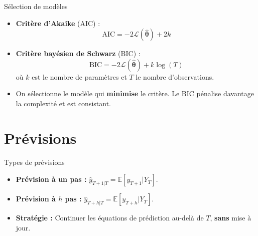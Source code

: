 \documentclass[11pt,aspectratio=169]{beamer}
\newcommand{\E}{\mathbb{E}}
\begin{document}
\begin{frame}{Sélection de modèles}

\begin{itemize}

\item \textbf{Critère d'Akaike} (AIC) :
  \[
  \mathrm{AIC} = -2\mathcal{L}(\hat{\bm{\theta}}) + 2k
  \]\newline

\item \textbf{Critère bayésien de Schwarz} (BIC) :
  \[
  \mathrm{BIC} = -2\mathcal{L}(\hat{\bm{\theta}}) + k \log(T)
  \]
  où $k$ est le nombre de paramètres et $T$ le nombre d'observations.\newline

\item On sélectionne le modèle qui \textbf{minimise} le critère. Le BIC pénalise davantage la complexité et est consistant.

\end{itemize}

\end{frame}

\section{Prévisions}

\begin{frame}{Types de prévisions}

\begin{itemize}

\item \textbf{Prévision à un pas :} $\hat{y}_{T+1|T} = \E[y_{T+1} | Y_T]$.\newline

\item \textbf{Prévision à $h$ pas :} $\hat{y}_{T+h|T} = \E[y_{T+h} | Y_T]$.\newline

\item \textbf{Stratégie :} Continuer les équations de prédiction au-delà de $T$, \textbf{sans} mise à jour.

\end{itemize}

\begin{center}
\end{center}

\end{frame}
\end{document}
